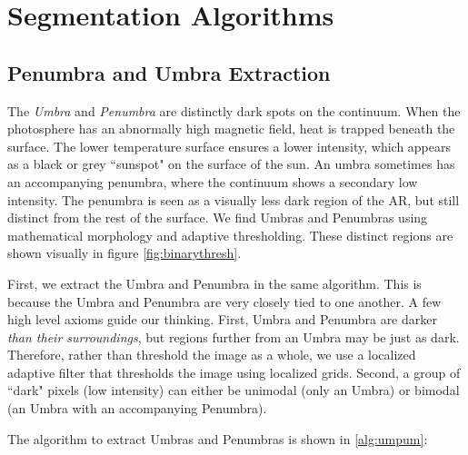 \documentclass[defaultstyle,11pt]{thesis}
\begin{document}
\nocite{*}		%


\appendix


\chapter{Segmentation Algorithms}
\label{appendix:algorithms}

\section{Penumbra and Umbra Extraction}
The \textit{Umbra} and \textit{Penumbra} are distinctly dark spots on the continuum. When the photosphere has an abnormally high magnetic field, heat is trapped beneath the surface. The lower temperature surface ensures a lower intensity, which appears as a black or grey ``sunspot" on the surface of the sun. An umbra sometimes has an accompanying penumbra, where the continuum shows a secondary low intensity. The penumbra is seen as a visually less dark region of the AR, but still distinct from the rest of the surface. We find Umbras and Penumbras using mathematical morphology and adaptive thresholding. These distinct regions are shown visually in figure \ref{fig:binarythresh}.

First, we extract the Umbra and Penumbra in the same algorithm. This is because the Umbra and Penumbra are very closely tied to one another. A few high level axioms guide our thinking. First, Umbra and Penumbra are darker \textit{than their surroundings}, but regions further from an Umbra may be just as dark. Therefore, rather than threshold the image as a whole, we use a localized adaptive filter that thresholds the image using localized grids. Second, a group of ``dark" pixels (low intensity) can either be unimodal (only an Umbra) or bimodal (an Umbra with an accompanying Penumbra). 

The algorithm to extract Umbras and Penumbras is shown in \ref{alg:umpum}:
\end{document}

